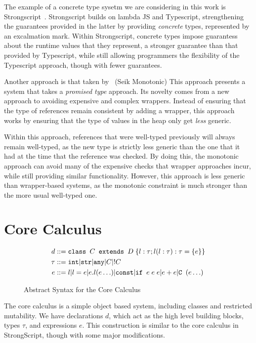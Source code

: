 \documentclass{llncs}
\newcommand{\class}[4]{\ensuremath\texttt{class } #1 \texttt{ extends } #2 \;\{#3; #4\}}
\newcommand{\field}[2]{\ensuremath #1 : #2}
\newcommand{\method}[4]{\ensuremath #1(#2):#3 = \{#4\}}
\newcommand{\ifabs}[3]{\texttt{if } #1\;#2\;#3}
\newcommand{\opplus}[2]{#1 + #2}
\newcommand{\newclass}[2]{\texttt{#1 }(#2)}
\newcommand{\strt}{\texttt{str}}
\newcommand{\intt}{\texttt{int}}
\newcommand{\anyt}{\texttt{any}}
\begin{document}
The example of a concrete type sysetm we are considering in this work is
Strongscript~\cite{stongscript}. Strongscript builds on lambda JS and 
Typescript, strengthening the guarantees provided in the latter by providing
\emph{concrete} types, represented by an excalmation mark. Within Strongscript,
concrete types impose guarantess about the runtime values that they represent, 
a stronger guarantee than that provided by Typescript, while still allowing
programmers the flexibility of the Typescript approach, though with fewer
guarantees.

Another approach is that taken by~\cite{seik-monotonic} (Seik Monotonic)
This approach presents a system that takes a \emph{promised type} approach.
Its novelty comes from a new approach to avoiding expensive and complex
wrappers. Instead of ensuring that the type of references remain consistent
by adding a wrapper, this approach works by ensuring that the type of values in
the heap only get \emph{less} generic.

Within this approach, references that were well-typed previously will always
remain well-typed, as the new type is strictly less generic than the one that
it had at the time that the reference was checked. By doing this, the monotonic
approach can avoid many of the expensive checks that wrapper approaches incur, 
while still providing similar functionality. However, this approach is less
generic than wrapper-based systems, as the monotonic constraint is much stronger
than the more usual well-typed one.

\section{Core Calculus}

\begin{figure}
\begin{align*}
d&::= \class{C}{D}{\field{l}{\tau}}{\method{l}{\field{l}{\tau}}{\tau}{e}}\\
\tau &::= \intt | \strt | \anyt | C | !C\\
e&::= l | l = e | e.l(e \ldots) | \texttt{const} | \ifabs{e}{e}{e} | \opplus{e}{e} | \newclass{C}{e\ldots}
\end{align*}

\caption{Abstract Syntax for the Core Calculus}
\end{figure}

The core calculus is a simple object based system, including classes and 
restricted mutability. We have declarations $d$, which act as the high level 
building blocks, types $\tau$, and expressions $e$. This construction is 
similar to the core calculus in StrongScript, though with some major 
modifications.
\end{document}
